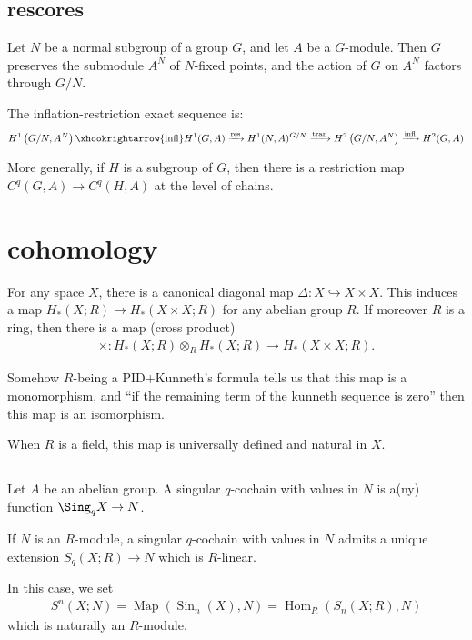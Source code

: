 \subsection*{rescores}
Let $N$ be a normal subgroup of a group $G$, and let $A$ be a $G$-module. Then $G$ preserves the submodule $A^N$ of $N$-fixed points, and the action of $G$ on $A^N$ factors through $G/N$.

The inflation-restriction exact sequence is:
\begin{align*}
  H^1\left(G / N, A^N\right) \xhookrightarrow{{\rm infl}} H^1(G, A)\xrightarrow{{\rm res}} H^1(N, A)^{G / N} \xrightarrow{{\rm tran}} H^2\left(G / N, A^N\right) \xrightarrow{{\rm infl}} H^2(G, A)
\end{align*}

More generally, if $H$ is a subgroup of $G$, then there is a restriction map $C^q(G,A)\to C^q(H,A)$ at the level of chains.


\section{cohomology}
For any space $X$, there is a canonical diagonal map $\Delta: X\hookrightarrow X\times X$. This induces a map $H_*(X;R) \to H_*(X\times X;R)$ for any abelian group $R$. If moreover $R$ is a ring, then there is a map (cross product)
\begin{align*}
  \times : H_*(X;R)\otimes_R H_*(X;R) \to H_*(X\times X;R).
\end{align*}

Somehow $R$-being a PID+Kunneth's formula tells us that this map is a monomorphism, and ``if the remaining term of the kunneth sequence is zero'' then this map is an isomorphism.

When $R$ is a field, this map is universally defined and natural in $X$.

\subsection{}
Let $A$ be an abelian group. A singular $q$-cochain with values in $N$ is a(ny) function $\Sing_q X\to N$.

If $N$ is an $R$-module, a singular $q$-cochain with values in $N$ admits a unique extension $S_q(X;R)\to N$ which is $R$-linear.

In this case, we set
\begin{align*}
  S^n(X ; N)=\operatorname{Map}\left(\operatorname{Sin}_n(X), N\right)=\operatorname{Hom}_R\left(S_n(X ; R), N\right)
\end{align*}
which is naturally an $R$-module.

